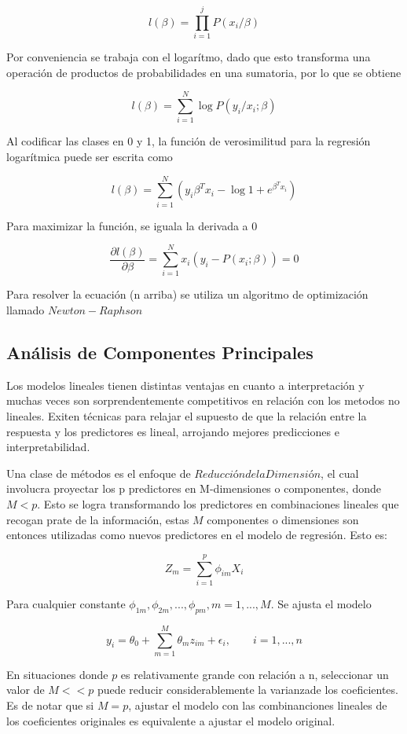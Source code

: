 \documentclass[a4paper,12pt]{Latex/Classes/PhDthesisPSnPDF}
\begin{document}
$$ l(\beta) = \prod_{i=1}^{j}{P(x_{i} / \beta)} $$
  
Por conveniencia se  trabaja con el logarítmo, dado que esto transforma una operación de productos de probabilidades en una sumatoria, por lo que se obtiene

$$ l(\beta) = \sum_{i=1}^{N} \log{P(y_{i}/ x_{i}; \beta)} $$

Al codificar las clases en 0 y 1, la función de verosimilitud para la regresión logarítmica puede ser escrita como

$$ l(\beta) = \sum_{i=1}^{N}(y_{i}\beta^{T}x_{i} - \log{1 + e^{\beta^{T}x_{i}}}) $$

Para maximizar la función, se iguala la derivada a 0

$$ \frac{\partial l(\beta)}{\partial \beta} = \sum_{i=1}^{N}x_{i}(y_{i} - P(x_{i}; \beta)) = 0 $$

Para resolver la ecuación (n arriba) se utiliza un algoritmo de optimización llamado $Newton-Raphson$

\subsection{Análisis de Componentes Principales}

Los modelos lineales tienen distintas ventajas en cuanto a interpretación y muchas veces son sorprendentemente competitivos en relación con los metodos no lineales. Exiten técnicas para relajar el supuesto de  que la relación entre la respuesta y los predictores es lineal, arrojando mejores predicciones e interpretabilidad. 

Una clase de métodos es el enfoque de $Reducción de la Dimensión$, el cual involucra proyectar los p predictores en M-dimensiones o componentes, donde $M < p$. Esto se logra transformando los predictores en combinaciones lineales que recogan prate de la información, estas $M$ componentes o dimensiones son entonces utilizadas como nuevos predictores en el modelo de regresión. Esto es:

$$ Z_{m} = \sum_{i = 1}^{p} \phi_{im}X_{i} $$

Para cualquier constante $ \phi_{1m}, \phi_{2m}, ..., \phi_{pm}, m = 1, ..., M $. Se ajusta el modelo

$$ y_{i} = \theta_{0} + \sum_{m = 1}^{M} \theta_{m}z_{im} + \epsilon_{i},  \qquad i = 1, ..., n $$

En situaciones donde $p$ es relativamente grande con relación a n, seleccionar un valor de $M << p$ puede reducir considerablemente la varianzade los coeficientes. Es de notar que si $M = p$, ajustar el modelo con las combinanciones lineales de los coeficientes originales es equivalente a ajustar el modelo original.
\end{document}
